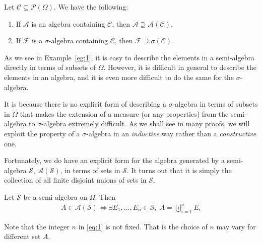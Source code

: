 \documentclass[thmcnt=section, 12pt, color=purple]{my-elegantbook}
\begin{document}
\begin{proposition} \label{pro:3}
	Let $\mathcal{C} \subseteq \mathcal{P}(\Omega)$.
	We have the following:
	\begin{enumerate}
		\item If $\mathcal{A}$ is an algebra containing $\mathcal{C}$,
			then $\mathcal{A} \supseteq \mathcal{A}(\mathcal{C})$.
		\item If $\mathcal{F}$ is a $\sigma$-algebra containing $\mathcal{C}$,
			then $\mathcal{F} \supseteq \sigma(\mathcal{C})$.
	\end{enumerate}
\end{proposition}


As we see in Example~\ref{eg:1},
it is easy to describe the elements in a semi-algebra
directly in terms of subsets of $\Omega$.
However, it is difficult in general to describe 
the elements in an algebra,
and it is even more difficult to do the same 
for the $\sigma$-algebra.

It is because there is no explicit form of
describing a $\sigma$-algebra in terms of subsets in $\Omega$
that makes the extension of a measure (or any properties) from 
the semi-algebra to $\sigma$-algebra extremely difficult.
As we shall see in many proofs, 
we will exploit the property of a $\sigma$-algebra
in an \textit{inductive} way rather than a \textit{constructive} one.

Fortunately, we do have an explicit form for the algebra generated
by a semi-algebra $\mathcal{S}$, $\mathcal{A}(\mathcal{S})$,
in terms of sets in $\mathcal{S}$.
It turns out that it is simply the collection
of all finite disjoint unions of sets in $\mathcal{S}$.

\begin{theorem} \label{thm:2}
	Let $\mathcal{S}$ be a semi-algebra on $\Omega$.
	Then
	\begin{align}
		A \in \mathcal{A}(\mathcal{S})
		\iff \exists E_1, \ldots, E_n \in \mathcal{S}, \;
		A = \biguplus_{i=1}^n E_i
		\label{eq:1}
	\end{align}
\end{theorem}

\begin{note}
	Note that the integer $n$ in \eqref{eq:1} is not fixed.
	That is the choice of $n$ may vary for different set $A$.
\end{note}
\end{document}
